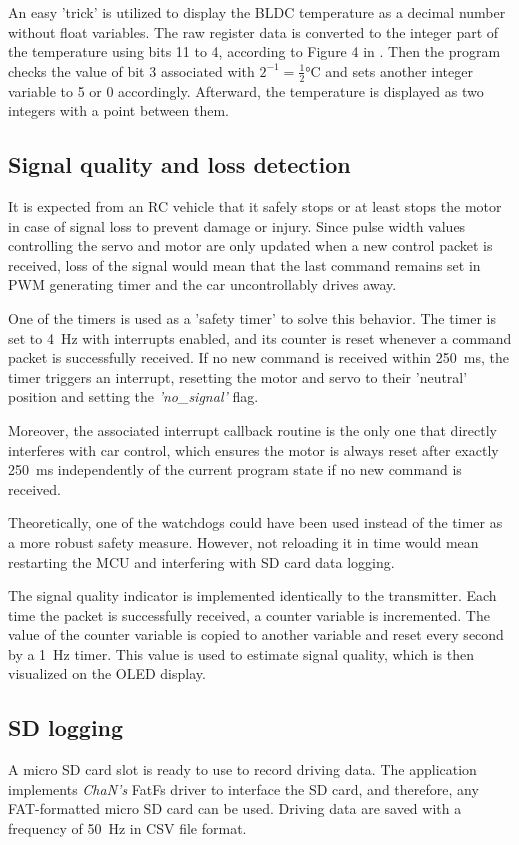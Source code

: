 An easy 'trick' is utilized to display the BLDC temperature as a decimal number without float variables. The raw register data is converted to the integer part of the temperature using bits 11 to 4, according to Figure 4 in \cite{ds_datasheet}. Then the program checks the value of bit 3 associated with $2^{-1} = \frac{1}{2}$\unit{\celsius} and sets another integer variable to 5 or 0 accordingly. Afterward, the temperature is displayed as two integers with a point between them.

\subsection{Signal quality and loss detection}
\label{sub:safety}
It is expected from an RC vehicle that it safely stops or at least stops the motor in case of signal loss to prevent damage or injury. Since pulse width values controlling the servo and motor are only updated when a new control packet is received, loss of the signal would mean that the last command remains set in PWM generating timer and the car uncontrollably drives away.

One of the timers is used as a 'safety timer' to solve this behavior. The timer is set to \SI{4}{\Hz} with interrupts enabled, and its counter is reset whenever a command packet is successfully received. If no new command is received within \SI{250}{\ms}, the timer triggers an interrupt, resetting the motor and servo to their 'neutral' position and setting the \textit{'no\_signal'} flag. 

Moreover, the associated interrupt callback routine is the only one that directly interferes with car control, which ensures the motor is always reset after exactly \SI{250}{\ms} independently of the current program state if no new command is received.

Theoretically, one of the watchdogs could have been used instead of the timer as a more robust safety measure. However, not reloading it in time would mean restarting the MCU and interfering with SD card data logging.

The signal quality indicator is implemented identically to the transmitter. Each time the packet is successfully received, a counter variable is incremented. The value of the counter variable is copied to another variable and reset every second by a \SI{1}{\Hz} timer. This value is used to estimate signal quality, which is then visualized on the OLED display.

\subsection{SD logging}
\label{sub:sd_log}
A micro SD card slot is ready to use to record driving data. The application implements \textit{ChaN's} FatFs driver to interface the SD card, and therefore, any FAT-formatted micro SD card can be used. Driving data are saved with a frequency of \SI{50}{\Hz} in CSV file format.

